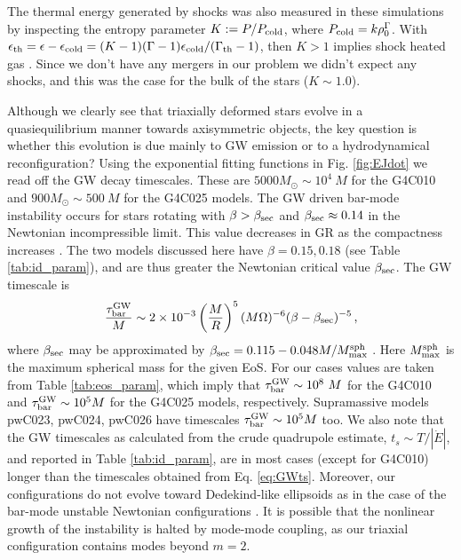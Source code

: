 \documentclass[twocolumn,superscriptaddress,showpacs,prd,aps,amsmath,amssymb,nofootinbib]{revtex4-1}
\newcommand{\GB}{\beta}
\newcommand{\GE}{\epsilon}
\newcommand{\GR}{\rho}
\newcommand{\GT}{\tau}
\newcommand{\be}{\begin{equation}}
\newcommand{\ee}{\end{equation}}
\begin{document}
The thermal energy
generated by shocks was also measured in these simulations by inspecting the entropy parameter
$K:=P/P_{\rm cold}$, where $P_{\rm cold}=k\GR_0^\Gamma$.
With $\GE_{\rm th}=\GE-\GE_{\rm cold}=(K-1)(\Gamma-1)\GE_{\rm cold}/(\Gamma_{\rm th}-1)$, 
then $K>1$ implies shock heated gas 
\cite{ELSB09}. Since we don't have any mergers in our problem we didn't expect any
shocks, and this was the case for the bulk of the stars ($K\sim 1.0$). 


Although we clearly see that triaxially deformed stars evolve in a
quasiequilibrium manner towards axisymmetric objects, the key question
is whether this evolution is due mainly to GW emission or to a
hydrodynamical reconfiguration?  Using the exponential fitting
functions in Fig. \ref{fig:EJdot} we read off the GW decay
timescales. These are $5000M_\odot\sim 10^4\ M$ for the G4C010 and
$900M_\odot\sim 500\ M$ for the G4C025 models. The GW driven bar-mode
instability occurs for stars rotating with $\GB>\GB_{\rm sec}$ and
$\GB_{\rm sec}\approx 0.14$ in the Newtonian incompressible limit.
This value decreases in GR as the compactness increases \cite{SF98}.
The two models discussed here have $\GB=0.15, 0.18$ (see Table
\ref{tab:id_param}), and are thus greater the Newtonian critical value
$\GB_{\rm sec}$. The GW timescale is \cite{FS75} 
\be 
\frac{\GT_{\rm bar}^{\rm GW}}{M}\sim 2\times
      10^{-3}\left(\frac{M}{R}\right)^5(M\Omega)^{-6}(\GB-\GB_{\rm sec})^{-5} \, ,
\label{eq:GWts}
\ee 
where $\GB_{\rm sec}$ may be approximated by 
$\GB_{\rm sec}=0.115-0.048 M/M_{\rm max}^{\rm sph}$ \cite{MSB99}.  Here
$M_{\rm max}^{\rm sph}$ is the maximum spherical mass for the given
EoS. For our cases values are taken from Table \ref{tab:eos_param},
which imply that $\GT_{\rm bar}^{\rm GW} \sim 10^8\ M$ for the G4C010
and $\GT_{\rm bar}^{\rm GW} \sim 10^5 M$ for the G4C025 models,
respectively. 
Supramassive models pwC023, pwC024, pwC026 have timescales 
$\GT_{\rm bar}^{\rm GW} \sim 10^5 M$ too.
We also note that the GW timescales as calculated from
the crude quadrupole estimate, $t_s\sim T/|\dot{E}|$, and reported in
Table \ref{tab:id_param}, are in most
cases (except for G4C010) longer than the timescales obtained
from Eq. \ref{eq:GWts}.  Moreover, our configurations do not evolve
toward Dedekind-like ellipsoids as in the case of the bar-mode
unstable Newtonian configurations \cite{LS1995,Miller73}. It is
possible that the nonlinear growth of the instability is halted by
mode-mode coupling, as our triaxial configuration contains modes
beyond $m=2$.
\end{document}
